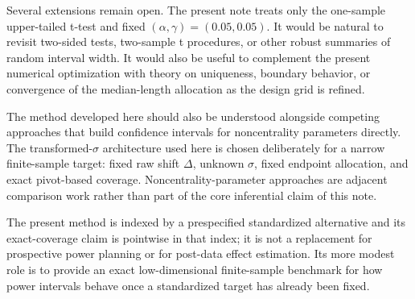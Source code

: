 \documentclass[11pt]{article}
\begin{document}
Several extensions remain open. The present note treats only the one-sample upper-tailed t-test and fixed $(\alpha,\gamma)=(0.05,0.05)$. It would be natural to revisit two-sided tests, two-sample t procedures, or other robust summaries of random interval width. It would also be useful to complement the present numerical optimization with theory on uniqueness, boundary behavior, or convergence of the median-length allocation as the design grid is refined.

The method developed here should also be understood alongside competing approaches that build confidence intervals for noncentrality parameters directly. The transformed-$\sigma$ architecture used here is chosen deliberately for a narrow finite-sample target: fixed raw shift $\Delta$, unknown $\sigma$, fixed endpoint allocation, and exact pivot-based coverage. Noncentrality-parameter approaches are adjacent comparison work rather than part of the core inferential claim of this note.

The present method is indexed by a prespecified standardized alternative and its exact-coverage claim is pointwise in that index; it is not a replacement for prospective power planning or for post-data effect estimation. Its more modest role is to provide an exact low-dimensional finite-sample benchmark for how power intervals behave once a standardized target has already been fixed.



\end{document}
